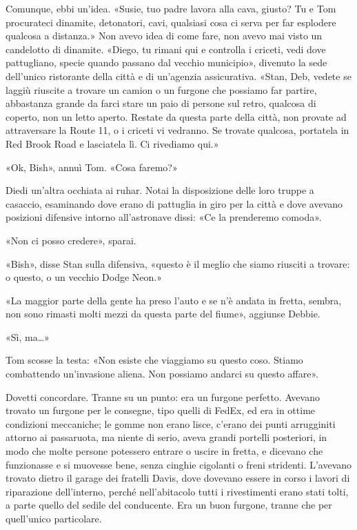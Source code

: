 Comunque, ebbi un'idea. «Susie, tuo padre lavora alla cava, giusto? Tu e
Tom procurateci dinamite, detonatori, cavi, qualsiasi cosa ci serva per
far esplodere qualcosa a distanza.» Non avevo idea di come fare, non
avevo mai visto un candelotto di dinamite. «Diego, tu rimani qui e
controlla i criceti, vedi dove pattugliano, specie quando passano dal
vecchio municipio», divenuto la sede dell'unico ristorante della città e
di un'agenzia assicurativa. «Stan, Deb, vedete se laggiù riuscite a
trovare un camion o un furgone che possiamo far partire, abbastanza
grande da farci stare un paio di persone sul retro, qualcosa di coperto,
non un letto aperto. Restate da questa parte della città, non provate ad
attraversare la Route 11, o i criceti vi vedranno. Se trovate qualcosa,
portatela in Red Brook Road e lasciatela lì. Ci rivediamo qui.»

«Ok, Bish», annuì Tom. «Cosa faremo?»

Diedi un'altra occhiata ai ruhar. Notai la disposizione delle loro
truppe a casaccio, esaminando dove erano di pattuglia in giro per la
città e dove avevano posizioni difensive intorno all'astronave dissi:
«Ce la prenderemo comoda».

\hfill\break

«Non ci posso credere», sparai.

«Bish», disse Stan sulla difensiva, «questo è il meglio che siamo
riusciti a trovare: o questo, o un vecchio Dodge Neon.»

«La maggior parte della gente ha preso l'auto e se n'è andata in fretta,
sembra, non sono rimasti molti mezzi da questa parte del fiume»,
aggiunse Debbie.

«Sì, ma\ldots»

Tom scosse la testa: «Non esiste che viaggiamo su questo coso. Stiamo
combattendo un'invasione aliena. Non possiamo andarci su questo affare».

Dovetti concordare. Tranne su un punto: era un furgone perfetto. Avevano
trovato un furgone per le consegne, tipo quelli di FedEx, ed era in
ottime condizioni meccaniche; le gomme non erano lisce, c'erano dei
punti arrugginiti attorno ai passaruota, ma niente di serio, aveva
grandi portelli posteriori, in modo che molte persone potessero entrare
o uscire in fretta, e dicevano che funzionasse e si muovesse bene, senza
cinghie cigolanti o freni stridenti. L'avevano trovato dietro il garage
dei fratelli Davis, dove dovevano essere in corso i lavori di
riparazione dell'interno, perché nell'abitacolo tutti i rivestimenti
erano stati tolti, a parte quello del sedile del conducente. Era un buon
furgone, tranne che per quell'unico particolare.

